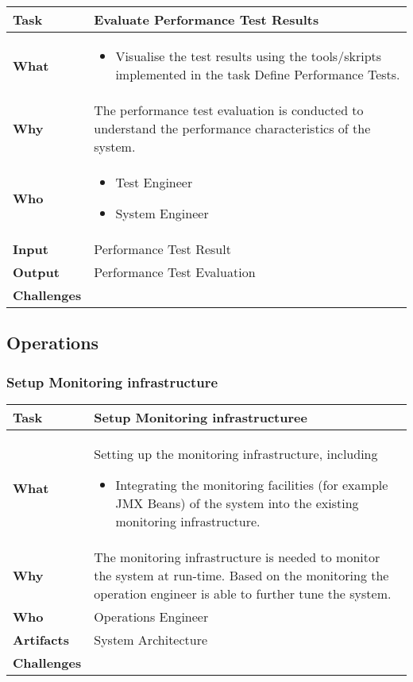 \begin{tabularx}{\textwidth}{@{} l X @{}}
	\caption{Evaluate Performance Test Results} \label{table:ch6_Evaluate_Performance_Results}\\
	\toprule 
	\bfseries Task & Evaluate Performance Test Results\\
	\midrule 
	\bfseries What & 
	\begin{itemize}
		\item Visualise the test results using the tools/skripts implemented in the task Define Performance Tests.
	\end{itemize}
	\\
	\midrule 
	\bfseries Why & The performance test evaluation is conducted to understand the performance characteristics of the system.\\
	\midrule 
	\bfseries Who & 
	\begin{itemize}
		\item Test Engineer
		\item System Engineer
	\end{itemize}
	\\
	\midrule 
	\bfseries Input & Performance Test Result\\
	\midrule 
	\bfseries Output & Performance Test Evaluation\\
	\midrule 
	\bfseries Challenges & \\
	\bottomrule 
\end{tabularx}

\subsection{Operations}

\subsubsection{Setup Monitoring infrastructure}
\begin{tabularx}{\textwidth}{@{} l X @{}}
	\caption{Setup Monitoring infrastructure} \label{table:ch6_Task_Setup_Monitoring_infrastructure}\\
	\toprule 
	\bfseries Task & Setup Monitoring infrastructuree\\
	\midrule 
	\bfseries What & Setting up the monitoring infrastructure, including
	\begin{itemize}
		\item Integrating the monitoring facilities (for example \ac{JMX} Beans) of the system into the existing monitoring infrastructure.
	\end{itemize}
	\\
	\midrule 
	\bfseries Why & The monitoring infrastructure is needed to monitor the system at run-time. Based on the monitoring the operation engineer is able to further tune the system.\\
	\midrule 
	\bfseries Who & Operations Engineer\\
	\midrule 
	\bfseries Artifacts & System Architecture\\
	\midrule 
	\bfseries Challenges & \\
	\bottomrule 
\end{tabularx}

